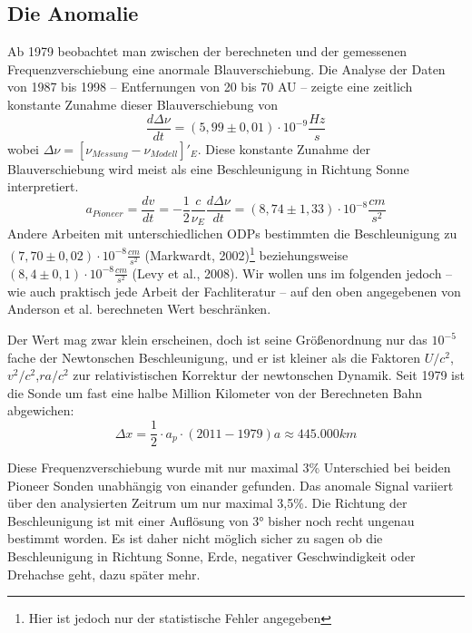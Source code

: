 
\subsection{Die Anomalie}
Ab 1979 beobachtet man zwischen der berechneten und der gemessenen Frequenzverschiebung eine anormale Blauverschiebung.
Die Analyse der Daten von 1987 bis 1998 – Entfernungen von 20 bis 70 AU – zeigte eine zeitlich konstante Zunahme dieser
Blauverschiebung von
\begin{equation}
  \frac{d\Delta\nu}{dt}=(5,99\pm0,01)\cdot10^{-9}\frac{Hz}{s}
\end{equation}
wobei $\Delta\nu=[\nu_{Messung}-\nu_{Modell}]'_E$. Diese konstante Zunahme der Blauverschiebung wird meist als eine
Beschleunigung in Richtung Sonne interpretiert.
\begin{equation}
  a_{Pioneer}=\frac{dv}{dt}=-\frac{1}{2}\frac{c}{\nu_E}\frac{d\Delta\nu}{dt} = (8,74\pm1,33)\cdot10^{-8}\frac{cm}{s^2}
\end{equation}
Andere Arbeiten mit unterschiedlichen ODPs bestimmten die Beschleunigung zu $(7,70
\pm0,02)\cdot10^{-8}\frac{cm}{s^2}$ (Markwardt,
2002)\footnote{Hier ist jedoch nur der statistische Fehler angegeben}\cite{Markwardt2002} beziehungsweise
$(8,4\pm0,1)\cdot10^{-8}\frac{cm}{s^2}$ (Levy et al., 2008)\cite{Levy2008}.
Wir wollen uns im folgenden jedoch – wie auch praktisch jede Arbeit der Fachliteratur – auf den oben angegebenen von
Anderson et al. berechneten Wert beschränken.

Der Wert mag zwar klein erscheinen, doch ist seine Größenordnung nur das $10^{-5}$ fache der Newtonschen Beschleunigung,
und er ist kleiner als die Faktoren $U/c^2$,$v^2/c^2$,$r a/c^2$ zur relativistischen Korrektur der newtonschen Dynamik.
Seit 1979 ist die Sonde um fast eine halbe Million Kilometer von der Berechneten Bahn abgewichen:
\begin{equation}
  \Delta x= \frac12 \cdot a_p \cdot (2011-1979) a\approx 445.000 km
\end{equation}

Diese Frequenzverschiebung wurde mit nur maximal 3\% Unterschied bei beiden Pioneer Sonden unabhängig von einander
gefunden. Das anomale Signal variiert über den analysierten Zeitrum um nur maximal 3,5\%. Die Richtung der
Beschleunigung ist mit einer Auflösung von 3° bisher noch recht ungenau bestimmt worden. Es ist daher nicht möglich
sicher zu sagen ob die Beschleunigung
in Richtung Sonne, Erde, negativer Geschwindigkeit oder Drehachse geht, dazu später mehr.
